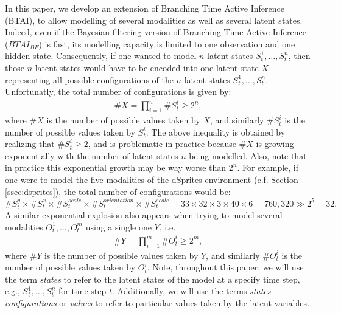\documentclass[twoside,11pt]{article}
\newcommand{\nb}[1]{\# #1}
\providecommand{\DIFadd}[1]{{\protect\color{blue}\uwave{#1}}} %
\providecommand{\DIFdel}[1]{{\protect\color{red}\sout{#1}}}                      %
\providecommand{\DIFaddbegin}{} %
\providecommand{\DIFaddend}{} %
\providecommand{\DIFdelbegin}{} %
\providecommand{\DIFdelend}{} %
\begin{document}
In this paper, we develop an extension of Branching Time Active Inference (BTAI), to allow modelling of several modalities as well as several latent states. Indeed, even if the Bayesian filtering version of Branching Time Active Inference ($BTAI_{BF}$) is fast, its modelling capacity is limited to one observation and one hidden state. Consequently, if one wanted to model $n$ latent states $S_t^1, \hdots, S_t^n$, then those $n$ latent states would have to be encoded into one latent state $X$ representing all possible configurations of the $n$ latent states $S_t^1, \hdots, S_t^n$. Unfortunatly, the total number of configurations is given by:
\begin{align*}
\nb{X} = \prod_{i=1}^n \nb{S_t^i} \geq 2^n,
\end{align*}
where $\nb{X}$ is the number of possible values taken by $X$, and similarly $\nb{S_t^i}$ is the number of possible values taken by $S_t^i$. The above inequality is obtained by realizing that $\nb{S_t^i} \geq 2$, and is problematic in practice because $\nb{X}$ is growing exponentially with the number of latent states $n$ being modelled. Also, note that in practice this exponential growth may be way worse than $2^n$. For example, 
if one were to model the five modalities of the dSprites environment (c.f. Section \ref{ssec:dsprites}), the total number of configurations would be:
$$\nb{S^y_t} \times \nb{S^{x}_t} \times \nb{S^{scale}_t} \times \nb{S^{orientation}_t} \times \nb{S^{scale}_t} = 33 \times 32 \times 3 \times 40 \times 6 = 760,320 \gg 2^5 = 32.$$
A similar exponential explosion also appears when trying to model several modalities $O_t^1, \hdots, O_t^m$ using a single one $Y$, i.e.
\begin{align*}
\nb{Y} = \prod_{i=1}^m \nb{O_t^i} \geq 2^m,
\end{align*}
where $\nb{Y}$ is the number of possible values taken by $Y$, and similarly $\nb{O_t^i}$ is the number of possible values taken by $O_t^i$. Note, throughout this paper, we will use the term \textit{states} to refer to the latent states of the model at a specify time step, e.g., $S_t^1, \hdots, S_t^n$ for time step $t$. Additionally, we will use the terms \textit{\DIFdelbegin \DIFdel{states }\DIFdelend \DIFaddbegin \DIFadd{state }\DIFaddend configurations} or \textit{values} to refer to particular values taken by the latent variables.
\end{document}
